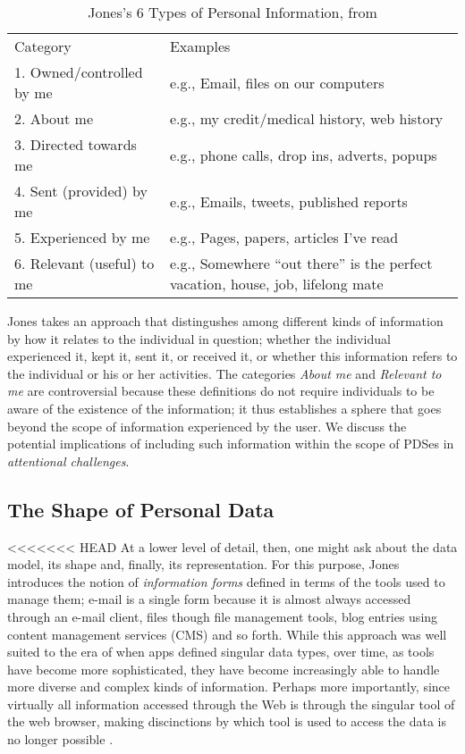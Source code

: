 \documentclass[runningheads,a4paper]{llncs}
\begin{document}
\begin{table}
\begin{tabular}{p{4cm} p{8cm}} 
Category & Examples \\
1. Owned/controlled by me & e.g., Email, files on our computers  \\
2. About me	& e.g., my credit/medical history, web history \\
3. Directed towards me & e.g., phone calls, drop ins, adverts, popups \\
4. Sent (provided) by me & e.g.,  Emails, tweets, published reports  \\
5. Experienced by me & e.g.,  Pages, papers, articles I’ve read \\
6. Relevant (useful) to me	& e.g.,  Somewhere ``out there'' is the perfect vacation, house, job, lifelong mate \\
\end{tabular}
\caption{Jones's 6 Types of Personal Information, from \cite{kftf}}
\label{fig:jonestype}
\end{table}

Jones takes an approach that distingushes among different kinds of information by how it relates to the individual in question; whether the individual experienced it, kept it, sent it, or received it, or whether this information refers to the individual or his or her activities.  The categories \emph{About me} and \emph{Relevant to me} are controversial because these definitions do not require individuals to be aware of the existence of the information; it thus establishes a sphere that goes beyond the scope of information experienced by the user.  We discuss the potential implications of including such information within the scope of PDSes in \emph{attentional challenges}. 

\subsection{The Shape of Personal Data}

<<<<<<< HEAD
At a lower level of detail, then, one might ask about the data model, its shape and, finally, its representation.  For this purpose, Jones introduces the notion of \emph{information forms} defined in terms of the tools used to manage them; e-mail is a single form because it is almost always accessed through an e-mail client, files though file management tools, blog entries using content management services (CMS) and so forth.  While this approach was well suited to the era of when apps defined singular data types, over time, as tools have become more sophisticated, they have become increasingly able to handle more diverse and complex kinds of information.  Perhaps more importantly, since virtually all information accessed through the Web is through the singular tool of the web browser, making discinctions by which tool is used to access the data is no longer possible .
\end{document}
